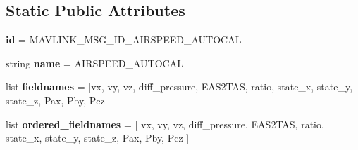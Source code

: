 \subsection*{Static Public Attributes}
\begin{DoxyCompactItemize}
\item 
\mbox{\label{classpymavlink_1_1dialects_1_1v10_1_1MAVLink__airspeed__autocal__message_aabdeebd0ff122af1af817831e1cdec49}} 
{\bfseries id} = M\+A\+V\+L\+I\+N\+K\+\_\+\+M\+S\+G\+\_\+\+I\+D\+\_\+\+A\+I\+R\+S\+P\+E\+E\+D\+\_\+\+A\+U\+T\+O\+C\+AL
\item 
\mbox{\label{classpymavlink_1_1dialects_1_1v10_1_1MAVLink__airspeed__autocal__message_a4f42fa861c1c4a01119677fe34fa36c5}} 
string {\bfseries name} = \textquotesingle{}A\+I\+R\+S\+P\+E\+E\+D\+\_\+\+A\+U\+T\+O\+C\+AL\textquotesingle{}
\item 
\mbox{\label{classpymavlink_1_1dialects_1_1v10_1_1MAVLink__airspeed__autocal__message_a4e9c98923bbe4a31c4105195322e08c5}} 
list {\bfseries fieldnames} = \mbox{[}\textquotesingle{}vx\textquotesingle{}, \textquotesingle{}vy\textquotesingle{}, \textquotesingle{}vz\textquotesingle{}, \textquotesingle{}diff\+\_\+pressure\textquotesingle{}, \textquotesingle{}E\+A\+S2\+T\+AS\textquotesingle{}, \textquotesingle{}ratio\textquotesingle{}, \textquotesingle{}state\+\_\+x\textquotesingle{}, \textquotesingle{}state\+\_\+y\textquotesingle{}, \textquotesingle{}state\+\_\+z\textquotesingle{}, \textquotesingle{}Pax\textquotesingle{}, \textquotesingle{}Pby\textquotesingle{}, \textquotesingle{}Pcz\textquotesingle{}\mbox{]}
\item 
\mbox{\label{classpymavlink_1_1dialects_1_1v10_1_1MAVLink__airspeed__autocal__message_ad8056b24e40240d30f7664119a9acf00}} 
list {\bfseries ordered\+\_\+fieldnames} = \mbox{[} \textquotesingle{}vx\textquotesingle{}, \textquotesingle{}vy\textquotesingle{}, \textquotesingle{}vz\textquotesingle{}, \textquotesingle{}diff\+\_\+pressure\textquotesingle{}, \textquotesingle{}E\+A\+S2\+T\+AS\textquotesingle{}, \textquotesingle{}ratio\textquotesingle{}, \textquotesingle{}state\+\_\+x\textquotesingle{}, \textquotesingle{}state\+\_\+y\textquotesingle{}, \textquotesingle{}state\+\_\+z\textquotesingle{}, \textquotesingle{}Pax\textquotesingle{}, \textquotesingle{}Pby\textquotesingle{}, \textquotesingle{}Pcz\textquotesingle{} \mbox{]}

\end{DoxyCompactItemize}
